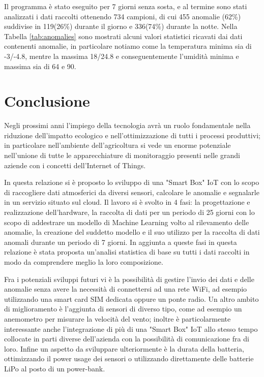\documentclass[fleqn, 12pt]{SelfArx}
\begin{document}
Il programma è stato eseguito per 7 giorni senza sosta, e al termine sono stati analizzati i dati raccolti ottenendo 734 campioni, di cui 455 anomalie (62\%) suddivise in 119(26\%) durante il giorno e 336(74\%) 
durante la notte. Nella Tabella \ref{tab:anomalies} sono mostrati alcuni valori statistici ricavati dai dati contenenti anomalie, in particolare notiamo come la temperatura minima sia di -3/-4.8, mentre la 
massima 18/24.8 e conseguentemente l'umidità minima e massima sia di 64 e 90.

\section{Conclusione}

Negli prossimi anni l'impiego della tecnologia avrà un ruolo fondamentale nella riduzione dell'impatto ecologico e nell'ottimizzazione di tutti i processi produttivi; in particolare nell'ambiente dell'agricoltura
si vede un enorme potenziale nell'unione di tutte le apparecchiature di monitoraggio presenti nelle grandi aziende con i concetti dell'Internet of Things. 

In questa relazione si è proposto lo sviluppo di una "Smart Box" IoT con lo scopo di raccogliere dati atmosferici da diversi sensori, calcolare le anomalie e segnalarle in un servizio situato sul cloud. 
Il lavoro si è svolto in 4 fasi: la progettazione e realizzazione dell'hardware, la raccolta di dati per un periodo di 25 giorni con lo scopo di addestrare un modello di Machine Learning volto al rilevamento delle 
anomalie, la creazione del suddetto modello e il suo utilizzo per la raccolta di dati anomali durante un periodo di 7 giorni. 
In aggiunta a queste fasi in questa relazione è stata proposta un'analisi statistica di base su tutti i dati raccolti in modo da comprendere meglio la loro composizione.

Fra i potenziali sviluppi futuri vi è la possibilità di gestire l'invio dei dati e delle anomalie senza avere la necessità di connettersi ad una rete WiFi, ad esempio utilizzando una smart card SIM dedicata oppure 
un ponte radio. Un altro ambito di miglioramento è l'aggiunta di sensori di diverso tipo, come ad esempio un anemometro per misurare la velocità del vento; inoltre è particolarmente interessante anche l'integrazione di 
più di una "Smart Box" IoT allo stesso tempo collocate in parti diverse dell'azienda con la possibilità di comunicazione fra di loro. 
Infine un aspetto da sviluppare ulteriormente è la durata della batteria, ottimizzando il power usage dei sensori o utilizzando direttamente delle batterie LiPo al posto di un power-bank.

\printbibliography
\end{document}
